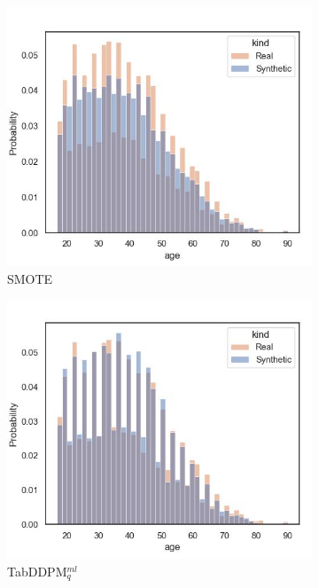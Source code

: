 \begin{figure}[H]
	\begin{subfigure}{0.3\textwidth}
		\centering
		\includegraphics[width=\textwidth]{images/dist_age/SMOTE.jpg}
		\caption{SMOTE}
	\end{subfigure}
	\begin{subfigure}{0.3\textwidth}
		\centering
		\includegraphics[width=\textwidth]{images/dist_age/tab-ddpm.jpg}
		\caption{TabDDPM$^{ml}_q$}
	\end{subfigure}
	\begin{subfigure}{0.3\textwidth}

\end{subfigure}
\end{figure}
